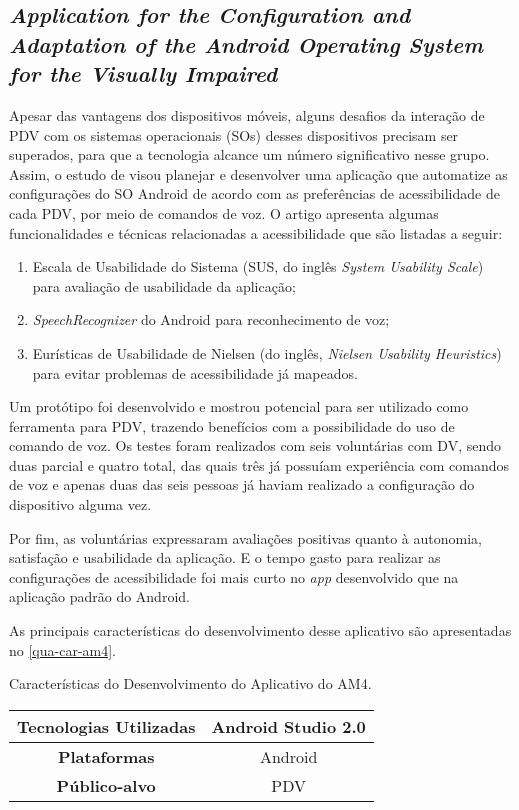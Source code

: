 \subsection{\emph{Application for the Configuration and Adaptation of the Android Operating System for the Visually Impaired}}

Apesar das vantagens dos dispositivos móveis, alguns desafios da interação de PDV com os sistemas operacionais (SOs) desses dispositivos precisam ser superados, para que a tecnologia alcance
um número significativo nesse grupo. Assim, o estudo de  visou planejar e desenvolver uma aplicação que automatize as configurações do SO Android de acordo com
as preferências de acessibilidade de cada PDV, por meio de comandos de voz. O artigo apresenta algumas funcionalidades e técnicas relacionadas a acessibilidade que são listadas a seguir:

\begin{enumerate}
  \item Escala de Usabilidade do Sistema (SUS, do inglês \emph{System Usability Scale}) para avaliação de usabilidade da aplicação;
  \item \emph{SpeechRecognizer} do Android para reconhecimento de voz;
  \item Eurísticas de Usabilidade de Nielsen (do inglês, \emph{Nielsen Usability Heuristics}) para evitar problemas de acessibilidade já mapeados.
\end{enumerate}

Um protótipo foi desenvolvido e mostrou potencial para ser utilizado como ferramenta para PDV, trazendo benefícios com a possibilidade do uso de comando de voz.
Os testes foram realizados com seis voluntárias com DV, sendo duas parcial e quatro total, das quais três já possuíam experiência com comandos de voz e apenas
duas das seis pessoas já haviam realizado a configuração do dispositivo alguma vez.

Por fim, as voluntárias expressaram avaliações positivas quanto à autonomia, satisfação e usabilidade da aplicação.
E o tempo gasto para realizar as configurações de acessibilidade foi mais curto no \emph{app} desenvolvido que na aplicação padrão do Android.

As principais características do desenvolvimento desse aplicativo são apresentadas no \autoref{qua-car-am4}.

\begin{quadro}[htb!]
  \caption{\label{qua-car-am4}Características do Desenvolvimento do Aplicativo do AM4.}
  \begin{tabular}{|c|c|}
    \hline
    \textbf{Tecnologias Utilizadas} & Android Studio 2.0 \\ \hline
    \textbf{Plataformas}            & Android            \\ \hline
    \textbf{Público-alvo}           & PDV                \\
    \hline
  \end{tabular}
\end{quadro}

